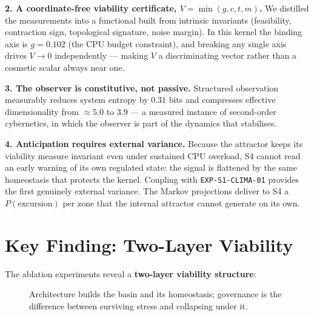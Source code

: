 \documentclass[11pt, a4paper]{article}
\begin{document}
\textbf{2. A coordinate-free viability certificate, $V = \min(g, c, t, m)$.}
We distilled the measurements into a functional built from intrinsic invariants
(feasibility, contraction sign, topological signature, noise margin). In this kernel
the binding axis is $g = 0{.}102$ (the CPU budget constraint), and breaking any single
axis drives $V \to 0$ independently --- making $V$ a discriminating vector rather than
a cosmetic scalar always near one.

\textbf{3. The observer is constitutive, not passive.} Structured observation
measurably reduces system entropy by $0{.}31$ bits and compresses effective
dimensionality from $\approx 5{.}0$ to $3{.}9$ --- a measured instance of
second-order cybernetics, in which the observer is part of the dynamics that
stabilises.

\textbf{4. Anticipation requires external variance.} Because the attractor keeps its
viability measure invariant even under sustained CPU overload, S4 cannot read an
early warning of its own regulated state: the signal is flattened by the same
homeostasis that protects the kernel. Coupling with \texttt{EXP-S1-CLIMA-01} provides
the first genuinely external variance. The Markov projections deliver to S4 a
$P(\text{excursion})$ per zone that the internal attractor cannot generate on its own.

\section*{Key Finding: Two-Layer Viability}

The ablation experiments reveal a \textbf{two-layer viability structure}:

\begin{figure}[h]
\centering
{}
\caption{Architecture builds the basin and its homeostasis; governance is the
difference between surviving stress and collapsing under it.}
\label{fig:two_layers}
\end{figure}
\end{document}
